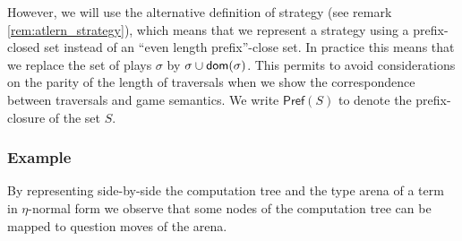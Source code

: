 However, we will use the alternative definition of strategy (see
remark \ref{rem:atlern_strategy}), which means that we represent a
strategy using a prefix-closed set instead of an ``even length
prefix''-close set. In practice this means that we replace the set
of plays $\sigma$ by $\sigma \cup \textsf{dom}(\sigma)$. This
permits to avoid considerations on the parity of the length of
traversals when we show the correspondence between traversals and
game semantics. We write $\textsf{Pref}(S)$ to denote the
prefix-closure of the set $S$.

\subsubsection{Example}

By representing side-by-side the computation tree and the type arena of a term in $\eta$-normal form we observe
that some nodes of the computation tree can be mapped to question moves of the arena.

